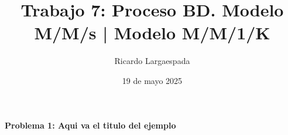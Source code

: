 \documentclass{article}
\title{Trabajo 7:  
Proceso BD. Modelo M/M/s | Modelo M/M/1/K}
\author{Ricardo Largaespada}
\date{19 de mayo 2025}
\begin{document}
\maketitle

\vspace{-.7cm}

\begin{problem} \textbf{Problema 1: Aqui va el titulo del ejemplo}

\end{problem}
\end{document}
